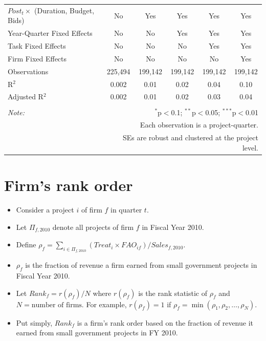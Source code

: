 \documentclass[]{article}
\providecommand{\tightlist}{%
  \setlength{\itemsep}{0pt}\setlength{\parskip}{0pt}}
\begin{document}
\begin{table}[H]
\begin{tabular}{@{\extracolsep{-2pt}}lccccc}
$Post_t \times $  (Duration, Budget, Bids) & No & Yes & Yes & Yes & Yes \\ 
Year-Quarter Fixed Effects & No & No & Yes & Yes & Yes \\ 
Task Fixed Effects & No & No & No & Yes & Yes \\ 
Firm Fixed Effects & No & No & No & No & Yes \\ 
Observations & 225,494 & 199,142 & 199,142 & 199,142 & 199,142 \\ 
R$^{2}$ & 0.002 & 0.01 & 0.02 & 0.04 & 0.10 \\ 
Adjusted R$^{2}$ & 0.002 & 0.01 & 0.02 & 0.03 & 0.04 \\ 
\hline 
\hline \\[-1.8ex] 
\textit{Note:}  & \multicolumn{5}{r}{$^{*}$p$<$0.1; $^{**}$p$<$0.05; $^{***}$p$<$0.01} \\ 
 & \multicolumn{5}{r}{Each observation is a project-quarter.} \\ 
 & \multicolumn{5}{r}{SEs are robust and clustered at the project level.} \\ 
\end{tabular} 
\end{table}

\hypertarget{firms-rank-order}{%
\section{Firm's rank order}\label{firms-rank-order}}

\begin{itemize}
\tightlist
\item
  Consider a project \(i\) of firm \(f\) in quarter \(t\).
\item
  Let \(\Pi_{f,2010}\) denote all projects of firm \(f\) in Fiscal Year
  2010.
\item
  Define
  \(\rho_f = \sum_{i \in \Pi_{f,2010}} (Treat_i \times FAO_{if})/Sales_{f,\text{2010}}\).
\item
  \(\rho_f\) is the fraction of revenue a firm earned from small
  government projects in Fiscal Year 2010.
\item
  Let \(Rank_f = r(\rho_f)/N\) where \(r(\rho_f)\) is the rank statistic
  of \(\rho_{f}\) and \(N = \text{number of firms}.\) For example,
  \(r(\rho_f)=1\) if \(\rho_f=\min(\rho_1,\rho_2,\ldots,\rho_N)\).
\item
  Put simply, \(Rank_f\) is a firm's rank order based on the fraction of
  revenue it earned from small government projects in FY 2010.
\end{itemize}
\end{document}

